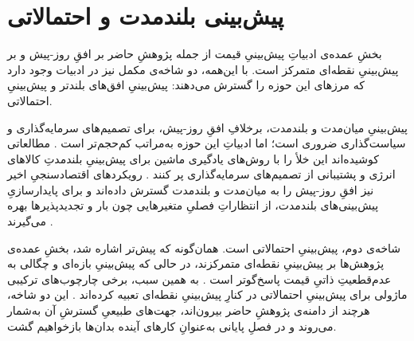 \section{پیش‌بینی بلندمدت و احتمالاتی}

بخشِ عمده‌ی ادبیاتِ پیش‌بینیِ قیمت  از جمله پژوهشِ حاضر  بر افقِ
روز-پیش و بر پیش‌بینیِ نقطه‌ای متمرکز است. با این‌همه، دو شاخه‌ی مکمل نیز در
ادبیات وجود دارد که مرزهای این حوزه را گسترش می‌دهند: پیش‌بینیِ افق‌های بلندتر و
پیش‌بینیِ احتمالاتی.

پیش‌بینیِ میان‌مدت و بلندمدت، برخلافِ افقِ روز-پیش، برای تصمیم‌های سرمایه‌گذاری و
سیاست‌گذاری ضروری است؛ اما ادبیاتِ این حوزه به‌مراتب کم‌حجم‌تر است
\cite{ziel_probabilistic_2018}. مطالعاتی کوشیده‌اند این خلأ را با روش‌های یادگیری
ماشین برای پیش‌بینیِ بلندمدتِ کالاهای انرژی و پشتیبانی از تصمیم‌های سرمایه‌گذاری
پر کنند \cite{yousefi_long-term_2019}. رویکردهای اقتصادسنجیِ اخیر نیز افقِ روز-پیش
را به میان‌مدت و بلندمدت گسترش داده‌اند و برای پایدارسازیِ پیش‌بینی‌های بلندمدت،
از انتظاراتِ فصلیِ متغیرهایی چون بار و تجدیدپذیرها بهره می‌گیرند
\cite{ghelasi_day-ahead_2025}.

شاخه‌ی دوم، پیش‌بینیِ احتمالاتی است. همان‌گونه که پیش‌تر اشاره شد، بخشِ عمده‌ی
پژوهش‌ها بر پیش‌بینیِ نقطه‌ای متمرکزند، در حالی که پیش‌بینیِ بازه‌ای و چگالی به
عدم‌قطعیتِ ذاتیِ قیمت پاسخ‌گوتر است \cite{chai_forecasting_2024}. به همین سبب،
برخی چارچوب‌های ترکیبی ماژولی برای پیش‌بینیِ احتمالاتی در کنارِ پیش‌بینیِ نقطه‌ای
تعبیه کرده‌اند \cite{zhang_deep_2020, jiang_multivariable_2023}. این دو شاخه،
هرچند از دامنه‌ی پژوهشِ حاضر بیرون‌اند، جهت‌های طبیعیِ گسترشِ آن به‌شمار می‌روند و
در فصلِ پایانی به‌عنوانِ کارهای آینده بدان‌ها بازخواهیم گشت.
